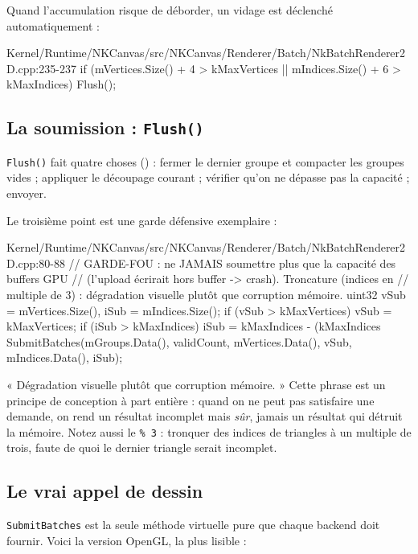 Quand l'accumulation risque de déborder, un vidage est déclenché
automatiquement :

\begin{nkcode}{Kernel/Runtime/NKCanvas/src/NKCanvas/Renderer/Batch/NkBatchRenderer2D.cpp:235-237}
  if (mVertices.Size() + 4 > kMaxVertices || mIndices.Size() + 6 > kMaxIndices) {
      Flush();
  }
\end{nkcode}

\subsection{La soumission : \texttt{Flush()}}

\texttt{Flush()} fait quatre choses () :
fermer le dernier groupe et compacter les groupes vides ; appliquer le découpage
courant ; vérifier qu'on ne dépasse pas la capacité ; envoyer.

Le troisième point est une garde défensive exemplaire :

\begin{nkcode}{Kernel/Runtime/NKCanvas/src/NKCanvas/Renderer/Batch/NkBatchRenderer2D.cpp:80-88}
// GARDE-FOU : ne JAMAIS soumettre plus que la capacité des buffers GPU
// (l'upload écrirait hors buffer -> crash). Troncature (indices en
// multiple de 3) : dégradation visuelle plutôt que corruption mémoire.
uint32 vSub = mVertices.Size(), iSub = mIndices.Size();
if (vSub > kMaxVertices) vSub = kMaxVertices;
if (iSub > kMaxIndices)  iSub = kMaxIndices - (kMaxIndices %
SubmitBatches(mGroups.Data(), validCount, mVertices.Data(), vSub, mIndices.Data(), iSub);
\end{nkcode}

\begin{nkretenir}
« Dégradation visuelle plutôt que corruption mémoire. » Cette phrase est un
principe de conception à part entière : quand on ne peut pas satisfaire une
demande, on rend un résultat incomplet mais \emph{sûr}, jamais un résultat qui
détruit la mémoire. Notez aussi le \texttt{\% 3} : tronquer des indices de
triangles à un multiple de trois, faute de quoi le dernier triangle serait
incomplet.
\end{nkretenir}

\subsection{Le vrai appel de dessin}

\texttt{SubmitBatches} est la seule méthode virtuelle pure que chaque backend
doit fournir. Voici la version OpenGL, la plus lisible :

